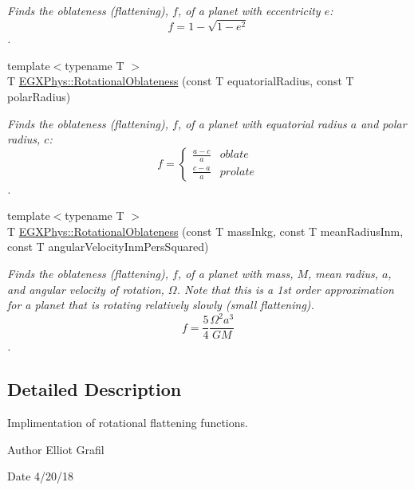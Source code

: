 \begin{DoxyCompactItemize}
\begin{DoxyCompactList}\small\item\em Finds the oblateness (flattening), $f$, of a planet with eccentricity $e$\+: \[ f = 1 - \sqrt{1-e^2} \]. \end{DoxyCompactList}\item 
{\footnotesize template$<$typename T $>$ }\\T \mbox{\hyperlink{group___e_g_x_phys-_astrophysics-_rotational_flattening_ga0bbe606845430e58be5ed34541835f83}{E\+G\+X\+Phys\+::\+Rotational\+Oblateness}} (const T equatorial\+Radius, const T polar\+Radius)
\begin{DoxyCompactList}\small\item\em Finds the oblateness (flattening), $f$, of a planet with equatorial radius $a$ and polar radius, $c$\+: \[ f =\begin{cases} \frac{a-c}{a}{} & oblate \\ \frac{c-a}{a} & prolate \end{cases} \]. \end{DoxyCompactList}\item 
{\footnotesize template$<$typename T $>$ }\\T \mbox{\hyperlink{group___e_g_x_phys-_astrophysics-_rotational_flattening_ga7d78d01c8b3e1a9b2e4f17cb67969a88}{E\+G\+X\+Phys\+::\+Rotational\+Oblateness}} (const T mass\+Inkg, const T mean\+Radius\+Inm, const T angular\+Velocity\+Inm\+Pers\+Squared)
\begin{DoxyCompactList}\small\item\em Finds the oblateness (flattening), $f$, of a planet with mass, $M$, mean radius, $a$, and angular velocity of rotation, $\Omega$. Note that this is a 1st order approximation for a planet that is rotating relatively slowly (small flattening). \[ f = \frac{5}{4} \frac{\Omega^2 a^3}{GM} \]. \end{DoxyCompactList}\end{DoxyCompactItemize}


\subsection{Detailed Description}
Implimentation of rotational flattening functions. 

\begin{DoxyAuthor}{Author}
Elliot Grafil 
\end{DoxyAuthor}
\begin{DoxyDate}{Date}
4/20/18 
\end{DoxyDate}

